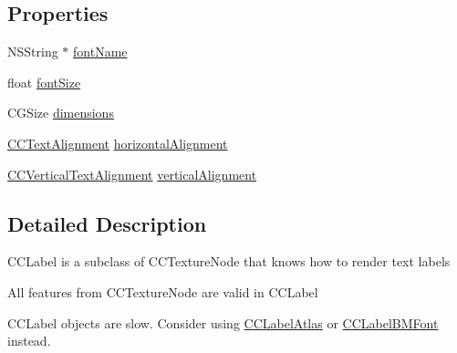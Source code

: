 \subsection*{Properties}
\begin{DoxyCompactItemize}
\item 
N\-S\-String $\ast$ \hyperlink{class_c_c_label_t_t_f_a199068e8677eb501ce9c4b450c6bd6d5}{font\-Name}
\item 
float \hyperlink{class_c_c_label_t_t_f_a1a0e51fec83aae88bb9442d5daf94ceb}{font\-Size}
\item 
C\-G\-Size \hyperlink{class_c_c_label_t_t_f_af20794a09f38a78b0f870e0bbc7bad1a}{dimensions}
\item 
\hyperlink{cc_types_8h_aa56b958f0cc9bdec20a15ed6bea3d0f1}{C\-C\-Text\-Alignment} \hyperlink{class_c_c_label_t_t_f_a16597bc8f8ede72cadbaf9c3d1aef4f9}{horizontal\-Alignment}
\item 
\hyperlink{cc_types_8h_a7ec81bc3a093bf8c36b996174d97dda3}{C\-C\-Vertical\-Text\-Alignment} \hyperlink{class_c_c_label_t_t_f_aa57f2a86a130d1f5058f2f45ca89a957}{vertical\-Alignment}
\end{DoxyCompactItemize}


\subsection{Detailed Description}
C\-C\-Label is a subclass of C\-C\-Texture\-Node that knows how to render text labels

All features from C\-C\-Texture\-Node are valid in C\-C\-Label

C\-C\-Label objects are slow. Consider using \hyperlink{interface_c_c_label_atlas}{C\-C\-Label\-Atlas} or \hyperlink{interface_c_c_label_b_m_font}{C\-C\-Label\-B\-M\-Font} instead. 

